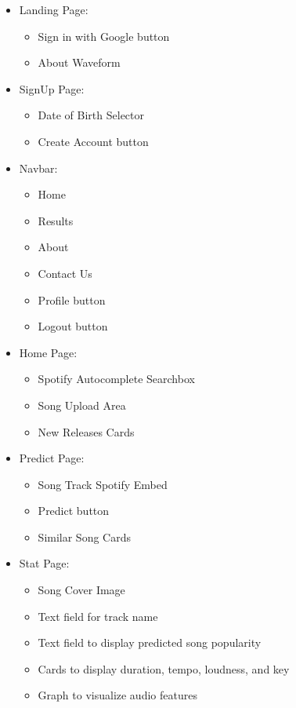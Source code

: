 \documentclass[11pt]{report}
\begin{document}
\begin{itemize}
    \item Landing Page:
    \begin{itemize}[label=--]
        \item Sign in with Google button
        \item About Waveform
    \end{itemize}
    
    \item SignUp Page:
    \begin{itemize}[label=--]
        \item Date of Birth Selector
        \item Create Account button
    \end{itemize}
    
    \item Navbar:
    \begin{itemize}[label=--]
        \item Home
        \item Results
        \item About
        \item Contact Us
        \item Profile button
        \item Logout button
    \end{itemize}
    
    \item Home Page:
    \begin{itemize}[label=--]
        \item Spotify Autocomplete Searchbox
        \item Song Upload Area
        \item New Releases Cards
    \end{itemize}
    
    \item Predict Page:
    \begin{itemize}[label=--]
        \item Song Track Spotify Embed
        \item Predict button
        \item Similar Song Cards
    \end{itemize}
    
    \item Stat Page:
    \begin{itemize}[label=--]
        \item Song Cover Image
        \item Text field for track name
        \item Text field to display predicted song popularity
        \item Cards to display duration, tempo, loudness, and key
        \item Graph to visualize audio features
    \end{itemize}
    

\end{itemize}
\end{document}
